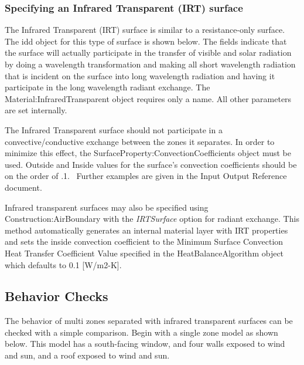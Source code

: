 \subsubsection{Specifying an Infrared Transparent (IRT) surface}\label{specifying-an-infrared-transparent-irt-surface}

The Infrared Transparent (IRT) surface is similar to a resistance-only surface. The idd object for this type of surface is shown below. The fields indicate that the surface will actually participate in the transfer of visible and solar radiation by doing a wavelength transformation and making all short wavelength radiation that is incident on the surface into long wavelength radiation and having it participate in the long wavelength radiant exchange. The Material:InfraredTransparent object requires only a name. All other parameters are set internally.

The Infrared Transparent surface should not participate in a convective/conductive exchange between the zones it separates. In order to minimize this effect, the SurfaceProperty:ConvectionCoefficients object must be used. Outside and Inside values for the surface's convection coefficients should be on the order of .1.~ Further examples are given in the Input Output Reference document.

Infrared transparent surfaces may also be specified using Construction:AirBoundary with the \textit{IRTSurface} option for radiant exchange. This method automatically generates an internal material layer with IRT properties and sets the inside convection coefficient to the Minimum Surface Convection Heat Transfer Coefficient Value specified in the HeatBalanceAlgorithm object which defaults to 0.1 [W/m2-K].

\subsection{Behavior Checks}\label{behavior-checks}

The behavior of multi zones separated with infrared transparent surfaces can be checked with a simple comparison. Begin with a single zone model as shown below. This model has a south-facing window, and four walls exposed to wind and sun, and a roof exposed to wind and sun.

